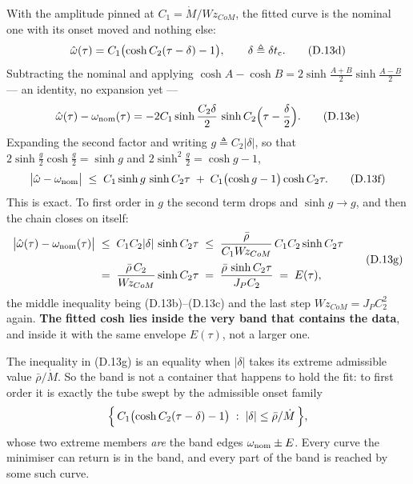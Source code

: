 \documentclass[11pt]{article}
\newcommand{\Wz}{W\!z_{CoM}}
\newcommand{\rbar}{\bar\rho}
\begin{document}
With the amplitude pinned at $C_1 = \dot M/\Wz$, the fitted curve is the
nominal one with its onset moved and nothing else:
\begin{equation}
  \hat\omega(\tau) = C_1\bigl(\cosh C_2(\tau - \delta) - 1\bigr),
  \qquad \delta \triangleq \delta t_{\rm c} .
  \tag{D.13d}
\end{equation}
Subtracting the nominal and applying
$\cosh A - \cosh B = 2\sinh\frac{A+B}{2}\sinh\frac{A-B}{2}$ --- an
identity, no expansion yet ---
\begin{equation}
  \hat\omega(\tau) - \omega_{\rm nom}(\tau)
   = -2C_1\sinh\frac{C_2\delta}{2}\,
       \sinh C_2\Bigl(\tau - \frac{\delta}{2}\Bigr).
  \tag{D.13e}
\end{equation}
Expanding the second factor and writing $g \triangleq C_2|\delta|$,
so that $2\sinh\frac g2\cosh\frac g2 = \sinh g$ and
$2\sinh^2\frac g2 = \cosh g - 1$,
\begin{equation}
  \bigl|\hat\omega - \omega_{\rm nom}\bigr|
   \;\le\; C_1\sinh g\,\sinh C_2\tau
     \;+\; C_1\bigl(\cosh g - 1\bigr)\cosh C_2\tau .
  \tag{D.13f}
\end{equation}
This is exact. To first order in $g$ the second term drops and
$\sinh g \to g$, and then the chain closes on itself:
\begin{equation}
\begin{aligned}
  \bigl|\hat\omega(\tau) - \omega_{\rm nom}(\tau)\bigr|
  &\;\le\; C_1C_2|\delta|\,\sinh C_2\tau
   \;\le\; \frac{\rbar}{C_1\Wz}\,C_1C_2\sinh C_2\tau \\[2pt]
  &\;=\; \frac{\rbar\,C_2}{\Wz}\sinh C_2\tau
   \;=\; \frac{\rbar\,\sinh C_2\tau}{J_PC_2}
   \;=\; E(\tau),
\end{aligned}
  \tag{D.13g}
\end{equation}
the middle inequality being (D.13b)--(D.13c) and the last step
$\Wz = J_PC_2^{2}$ again. \textbf{The fitted cosh lies inside the very
band that contains the data}, and inside it with the same envelope
$E(\tau)$, not a larger one.

The inequality in (D.13g) is an equality when $|\delta|$ takes its
extreme admissible value $\rbar/\dot M$. So the band is not a container
that happens to hold the fit: to first order it is exactly the tube
swept by the admissible onset family
\[
  \Bigl\{\,C_1\bigl(\cosh C_2(\tau-\delta) - 1\bigr)
   \;:\; |\delta| \le \rbar/\dot M \,\Bigr\},
\]
whose two extreme members \emph{are} the band edges
$\omega_{\rm nom}\pm E$. Every curve the minimiser can return is in the
band, and every part of the band is reached by some such curve.
\end{document}
